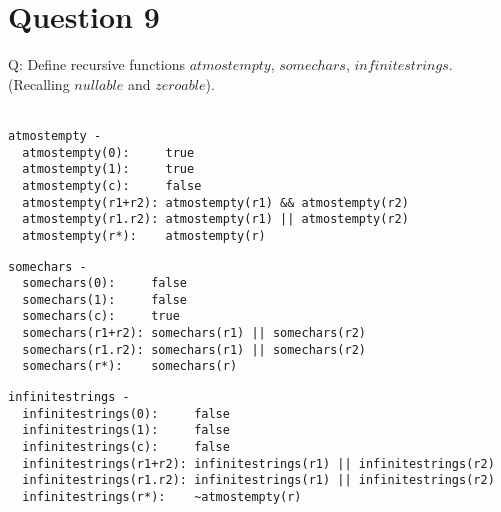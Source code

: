 \documentclass[english]{scrartcl}
\begin{document}
\section*{Question 9}
Q: Define recursive functions $atmostempty$, $somechars$, $infinitestrings$. (Recalling $nullable$ and $zeroable$). \\
\\
\begin{verbatim}
atmostempty -
  atmostempty(0):     true
  atmostempty(1):     true
  atmostempty(c):     false
  atmostempty(r1+r2): atmostempty(r1) && atmostempty(r2)
  atmostempty(r1.r2): atmostempty(r1) || atmostempty(r2)
  atmostempty(r*):    atmostempty(r)
\end{verbatim}
\begin{verbatim}
somechars -
  somechars(0):     false
  somechars(1):     false
  somechars(c):     true
  somechars(r1+r2): somechars(r1) || somechars(r2)
  somechars(r1.r2): somechars(r1) || somechars(r2)
  somechars(r*):    somechars(r)
\end{verbatim}
\begin{verbatim}
infinitestrings -
  infinitestrings(0):     false
  infinitestrings(1):     false
  infinitestrings(c):     false
  infinitestrings(r1+r2): infinitestrings(r1) || infinitestrings(r2)
  infinitestrings(r1.r2): infinitestrings(r1) || infinitestrings(r2)
  infinitestrings(r*):    ~atmostempty(r)
\end{verbatim}
\end{document}
